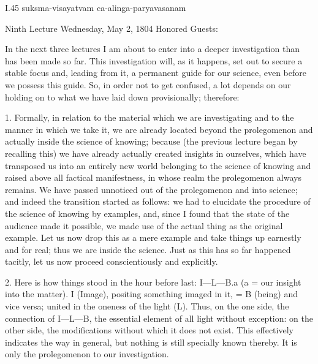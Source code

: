 I.45
suksma-visayatvam ca-alinga-paryavasanam

Ninth Lecture
Wednesday, May 2, 1804
Honored Guests:

In the next three lectures I am about to enter
into a deeper investigation than has been made so far.
This investigation will, as it happens,
set out to secure a stable focus
and, leading from it, a permanent guide for our science,
even before we possess this guide.
So, in order not to get confused, a lot depends
on our holding on to what we have laid down provisionally;
therefore:

1. Formally, in relation to the material
which we are investigating
and to the manner in which we take it,
we are already located beyond the prolegomenon
and actually inside the science of knowing;
because (the previous lecture began by recalling this)
we have already actually created insights in ourselves,
which have transposed us into an entirely new world
belonging to the science of knowing
and raised above all factical manifestness,
in whose realm the prolegomenon always remains.
We have passed unnoticed out of
the prolegomenon and into science;
and indeed the transition started as follows:
we had to elucidate the procedure of
the science of knowing by examples,
and, since I found that the state of
the audience made it possible,
we made use of the actual thing
as the original example.
Let us now drop this as a mere example
and take things up earnestly and for real;
thus we are inside the science.
Just as this has so far happened tacitly,
let us now proceed conscientiously and explicitly.

2. Here is how things stood in the hour before last:
I—L—B.a (a = our insight into the matter).
I (Image), positing something imaged in it,
= B (being) and vice versa;
united in the oneness of the light (L).
Thus, on the one side,
the connection of I—L—B,
the essential element of all light without exception:
on the other side, the modifications
without which it does not exist.
This effectively indicates the way in general,
but nothing is still specially known thereby.
It is only the prolegomenon to our investigation.

